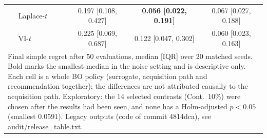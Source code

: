 \begin{tabular}{llccc}
 & Laplace-$t$ & 0.197 [0.108, 0.427] & \textbf{0.056 [0.022, 0.191]} & 0.067 [0.027, 0.188] \\
 & VI-$t$ & 0.225 [0.069, 0.687] & 0.122 [0.047, 0.302] & 0.060 [0.023, 0.163] \\
\bottomrule
\multicolumn{5}{p{14cm}}{\footnotesize Final simple regret after 50 evaluations, median [IQR] over 20 matched seeds. Bold marks the smallest median in the noise setting and is descriptive only. Each cell is a whole BO policy (surrogate, acquisition path and recommendation together); the differences are not attributed causally to the acquisition path. Exploratory: the 14 selected contrasts (Cont.~10\%) were chosen after the results had been seen, and none has a Holm-adjusted $p<0.05$ (smallest 0.0591). Legacy outputs (code of commit 4814dca), see audit/release\_table.txt.} \\
\end{tabular}
